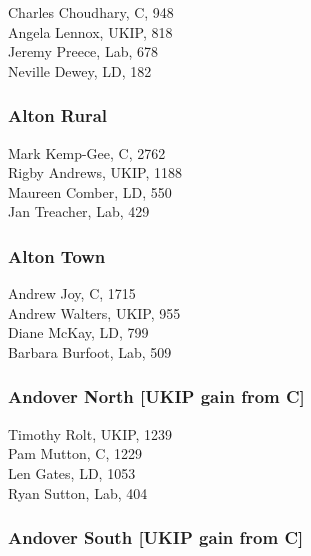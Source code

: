 \documentclass[a4paper,openany,10pt]{book}
\begin{document}


Charles Choudhary, C, 948\\
Angela Lennox, UKIP, 818\\
Jeremy Preece, Lab, 678\\
Neville Dewey, LD, 182\\


\subsubsection*{Alton Rural}



Mark Kemp-Gee, C, 2762\\
Rigby Andrews, UKIP, 1188\\
Maureen Comber, LD, 550\\
Jan Treacher, Lab, 429\\


\subsubsection*{Alton Town}



Andrew Joy, C, 1715\\
Andrew Walters, UKIP, 955\\
Diane McKay, LD, 799\\
Barbara Burfoot, Lab, 509\\


\subsubsection*{Andover North \hspace*{\fill}\nolinebreak[1]%
\enspace\hspace*{\fill}
[UKIP gain from C]}



Timothy Rolt, UKIP, 1239\\
Pam Mutton, C, 1229\\
Len Gates, LD, 1053\\
Ryan Sutton, Lab, 404\\


\subsubsection*{Andover South \hspace*{\fill}\nolinebreak[1]%
\enspace\hspace*{\fill}
[UKIP gain from C]}
\end{document}
